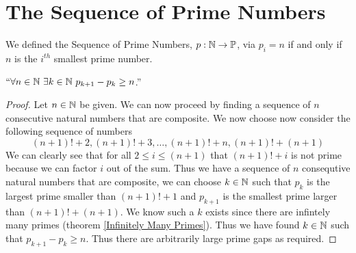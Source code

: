    \section{The Sequence of Prime Numbers}
        \begin{definition}
            We defined the Sequence of Prime Numbers, $p: \mathbb{N} \rightarrow \mathbb{P}$, via
            $p_i = n$ if and only if $n$ is the $i^{th}$ smallest prime number.
        \end{definition}
        \begin{theorem}
            $``\forall n \in \mathbb{N} \ \exists k \in \mathbb{N} \ p_{k + 1} - p_{k} \ge n$.''
        \end{theorem}
        \begin{proof}
            Let $n \in \mathbb{N}$ be given. We can now proceed by finding a sequence of $n$ consecutive
            natural numbers that are composite. We now choose now consider the following sequence of
            numbers
            \[
                (n + 1)! + 2, (n + 1)! + 3, \dots, (n + 1)! + n, (n + 1)! + (n + 1)
            \]
            We can clearly see that for all $2 \le i \le (n + 1)$ that $(n + 1)! + i$
            is not prime because we can factor $i$ out of the sum. Thus we have a sequence of $n$
            consequtive natural numbers that are composite, we can choose $k \in \mathbb{N}$ such
            that $p_k$ is the largest prime smaller than $(n + 1)! + 1$ and $p_{k + 1}$ is the
            smallest prime larger than $(n + 1)! + (n + 1)$. We know such a $k$ exists since there
            are infintely many primes (theorem \ref{Infinitely Many Primes}). Thus we have found
            $k \in \mathbb{N}$ such that $p_{k + 1} - p_k \ge n$. Thus there are arbitrarily large
            prime gaps as required. \QED
        \end{proof}
